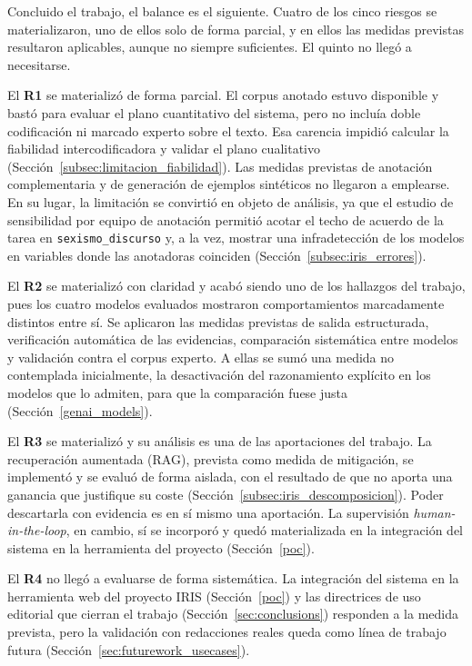 Concluido el trabajo, el balance es el siguiente. Cuatro de los cinco riesgos se
materializaron, uno de ellos solo de forma parcial, y en ellos las medidas previstas
resultaron aplicables, aunque no siempre suficientes. El quinto no llegó a necesitarse.

El \textbf{R1} se materializó de forma parcial. El corpus anotado estuvo disponible y
bastó para evaluar el plano cuantitativo del sistema, pero no incluía doble
codificación ni marcado experto sobre el texto. Esa carencia impidió calcular la
fiabilidad intercodificadora y validar el plano cualitativo
(Sección~\ref{subsec:limitacion_fiabilidad}). Las medidas previstas de anotación
complementaria y de generación de ejemplos sintéticos no llegaron a emplearse. En su
lugar, la limitación se convirtió en objeto de análisis, ya que el estudio de
sensibilidad por equipo de anotación permitió acotar el techo de acuerdo de la tarea en
\texttt{sexismo\_discurso} y, a la vez, mostrar una infradetección de los modelos en
variables donde las anotadoras coinciden (Sección~\ref{subsec:iris_errores}).

El \textbf{R2} se materializó con claridad y acabó siendo uno de los hallazgos del
trabajo, pues los cuatro modelos evaluados mostraron comportamientos marcadamente
distintos entre sí. Se aplicaron las medidas previstas de salida estructurada,
verificación automática de las evidencias, comparación sistemática entre modelos y
validación contra el corpus experto. A ellas se sumó una medida no contemplada
inicialmente, la desactivación del razonamiento explícito en los modelos que lo
admiten, para que la comparación fuese justa
(Sección~\ref{genai_models}).

El \textbf{R3} se materializó y su análisis es una de las aportaciones del trabajo. La
recuperación aumentada (RAG), prevista como medida de mitigación, se implementó y se
evaluó de forma aislada, con el resultado de que no aporta una ganancia que justifique su coste
(Sección~\ref{subsec:iris_descomposicion}). Poder descartarla con evidencia es en sí
mismo una aportación. La supervisión \textit{human-in-the-loop}, en cambio, sí se
incorporó y quedó materializada en la integración del sistema en la herramienta
del proyecto (Sección~\ref{poc}).

El \textbf{R4} no llegó a evaluarse de forma sistemática. La integración del sistema
en la herramienta web del proyecto IRIS (Sección~\ref{poc}) y las directrices de uso
editorial que cierran el trabajo (Sección~\ref{sec:conclusions}) responden a la
medida prevista, pero la validación con redacciones reales queda como línea de
trabajo futura (Sección~\ref{sec:futurework_usecases}).


